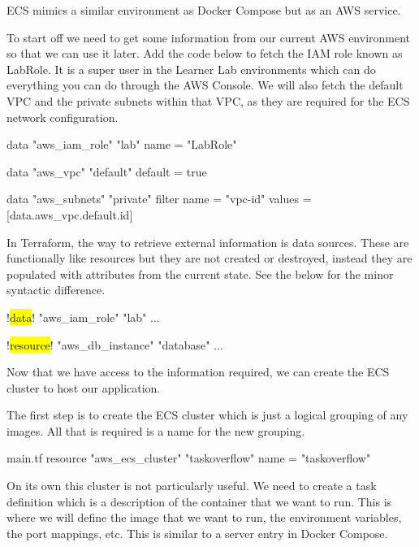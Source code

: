 \documentclass{csse4400}
\begin{document}
ECS mimics a similar environment as Docker Compose but as an AWS service.

To start off we need to get some information from our current AWS environment so that we can use it later.
Add the code below to fetch the IAM role known as LabRole.
It is a super user in the Learner Lab environments which can do everything you can do through the AWS Console.
We will also fetch the default VPC and the private subnets within that VPC,
 as they are required for the ECS network configuration.

\begin{code}[language=terraform,numbers=none]{}
data "aws_iam_role" "lab" {
    name = "LabRole"
}

data "aws_vpc" "default" {
    default = true
}

data "aws_subnets" "private" {
    filter {
        name   = "vpc-id"
        values = [data.aws_vpc.default.id]
    }
}
\end{code}

In Terraform, the way to retrieve external information is data sources.
These are functionally like resources but they are not created or destroyed,
instead they are populated with attributes from the current state.
See the below for the minor syntactic difference.

\begin{code}[language=terraform,numbers=none,escapechar=!]{}
!\colorbox{yellow}{data}! "aws_iam_role" "lab" {
  ...
}

!\colorbox{yellow}{resource}! "aws_db_instance" "database" {
  ...
}
\end{code}


Now that we have access to the information required,
we can create the ECS cluster to host our application.

The first step is to create the ECS cluster
which is just a logical grouping of any images.
All that is required is a name for the new grouping.

\begin{code}[language=terraform,numbers=none]{main.tf}
resource "aws_ecs_cluster" "taskoverflow" {
    name = "taskoverflow"
}
\end{code}

On its own this cluster is not particularly useful.
We need to create a task definition which is a description of the container that we want to run.
This is where we will define the image that we want to run,
the environment variables,
the port mappings, etc.
This is similar to a server entry in Docker Compose.
\end{document}
